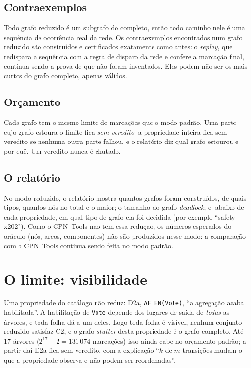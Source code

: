 \documentclass[11pt,a4paper]{report}
\newcommand{\cpntools}{CPN~Tools}
\newcommand{\code}[1]{\texttt{\small #1}}
\theoremstyle{definition}
\begin{document}
\section{Contraexemplos}

Todo grafo reduzido é um subgrafo do completo, então todo caminho nele é uma
sequência de ocorrência real da rede. Os contraexemplos encontrados num grafo
reduzido são construídos e certificados exatamente como antes: o
\emph{replay}, que redispara a sequência com a regra de disparo da rede e
confere a marcação final, continua sendo a prova de que não foram inventados.
Eles podem não ser os mais curtos do grafo completo, apenas válidos.

\section{Orçamento}

Cada grafo tem o mesmo limite de marcações que o modo padrão. Uma parte cujo
grafo estoura o limite fica \emph{sem veredito}; a propriedade inteira fica
sem veredito se nenhuma outra parte falhou, e o relatório diz qual grafo
estourou e por quê. Um veredito nunca é chutado.

\section{O relatório}

No modo reduzido, o relatório mostra quantos grafos foram construídos, de
quais tipos, quantos nós no total e o maior; o tamanho do grafo
\emph{deadlock}; e, abaixo de cada propriedade, em qual tipo de grafo ela foi
decidida (por exemplo ``safety x202''). Como o \cpntools{} não tem essa redução,
os números esperados do oráculo (nós, arcos, componentes) não são produzidos
nesse modo: a comparação com o \cpntools{} continua sendo feita no modo
padrão.

\chapter{O limite: visibilidade}
\label{cap:limite}

Uma propriedade do catálogo não reduz: D2a, \code{AF EN(Vote)}, ``a agregação
acaba habilitada''. A habilitação de \code{Vote} depende dos lugares de saída
de \emph{todas} as árvores, e toda folha dá a um deles. Logo toda folha é
visível, nenhum conjunto reduzido satisfaz C2, e o grafo \emph{stutter} desta
propriedade é o grafo completo. Até 17 árvores ($2^{17}+2 = 131\,074$ marcações) isso ainda cabe no orçamento
padrão; a partir daí D2a fica sem veredito, com a explicação ``$k$ de $m$
transições mudam o que a propriedade observa e não podem ser reordenadas''.
\end{document}
